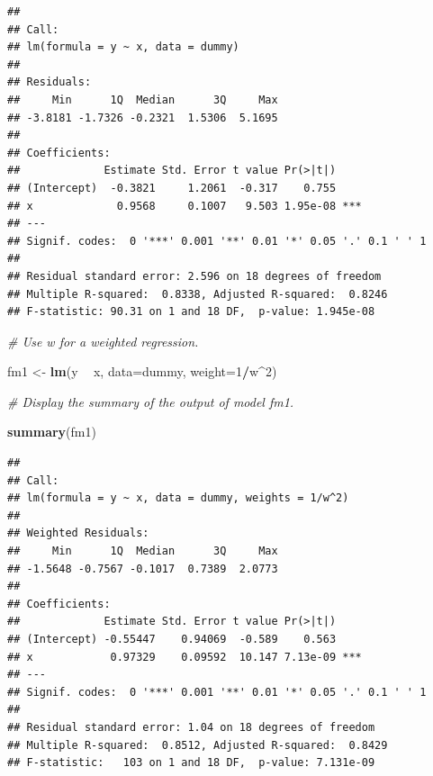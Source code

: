 \documentclass[]{book}
\newenvironment{Shaded}{\begin{snugshade}}{\end{snugshade}}
\newcommand{\CommentTok}[1]{\textcolor[rgb]{0.56,0.35,0.01}{\textit{#1}}}
\newcommand{\DataTypeTok}[1]{\textcolor[rgb]{0.13,0.29,0.53}{#1}}
\newcommand{\DecValTok}[1]{\textcolor[rgb]{0.00,0.00,0.81}{#1}}
\newcommand{\KeywordTok}[1]{\textcolor[rgb]{0.13,0.29,0.53}{\textbf{#1}}}
\newcommand{\NormalTok}[1]{#1}
\newcommand{\OperatorTok}[1]{\textcolor[rgb]{0.81,0.36,0.00}{\textbf{#1}}}
\newcommand{\StringTok}[1]{\textcolor[rgb]{0.31,0.60,0.02}{#1}}
\begin{document}
\begin{verbatim}
## 
## Call:
## lm(formula = y ~ x, data = dummy)
## 
## Residuals:
##     Min      1Q  Median      3Q     Max 
## -3.8181 -1.7326 -0.2321  1.5306  5.1695 
## 
## Coefficients:
##             Estimate Std. Error t value Pr(>|t|)    
## (Intercept)  -0.3821     1.2061  -0.317    0.755    
## x             0.9568     0.1007   9.503 1.95e-08 ***
## ---
## Signif. codes:  0 '***' 0.001 '**' 0.01 '*' 0.05 '.' 0.1 ' ' 1
## 
## Residual standard error: 2.596 on 18 degrees of freedom
## Multiple R-squared:  0.8338, Adjusted R-squared:  0.8246 
## F-statistic: 90.31 on 1 and 18 DF,  p-value: 1.945e-08
\end{verbatim}

\begin{Shaded}
\begin{Highlighting}[]
\CommentTok{# Use w for a weighted regression.}

\NormalTok{fm1 <-}\StringTok{ }\KeywordTok{lm}\NormalTok{(y }\OperatorTok{~}\StringTok{ }\NormalTok{x, }\DataTypeTok{data=}\NormalTok{dummy, }\DataTypeTok{weight=}\DecValTok{1}\OperatorTok{/}\NormalTok{w}\OperatorTok{^}\DecValTok{2}\NormalTok{) }

\CommentTok{# Display the summary of the output of model fm1.}

\KeywordTok{summary}\NormalTok{(fm1)}
\end{Highlighting}
\end{Shaded}

\begin{verbatim}
## 
## Call:
## lm(formula = y ~ x, data = dummy, weights = 1/w^2)
## 
## Weighted Residuals:
##     Min      1Q  Median      3Q     Max 
## -1.5648 -0.7567 -0.1017  0.7389  2.0773 
## 
## Coefficients:
##             Estimate Std. Error t value Pr(>|t|)    
## (Intercept) -0.55447    0.94069  -0.589    0.563    
## x            0.97329    0.09592  10.147 7.13e-09 ***
## ---
## Signif. codes:  0 '***' 0.001 '**' 0.01 '*' 0.05 '.' 0.1 ' ' 1
## 
## Residual standard error: 1.04 on 18 degrees of freedom
## Multiple R-squared:  0.8512, Adjusted R-squared:  0.8429 
## F-statistic:   103 on 1 and 18 DF,  p-value: 7.131e-09
\end{verbatim}
\end{document}

